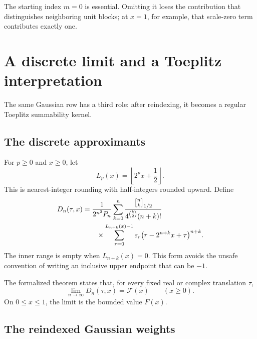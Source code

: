 \documentclass[11pt]{article}
\theoremstyle{definition}
\newcommand{\Fabius}{F}
\newcommand{\eps}{\varepsilon}
\newcommand{\Qbin}[3]{\genfrac{[}{]}{0pt}{}{#1}{#2}_{#3}}
\newcommand{\floor}[1]{\left\lfloor #1\right\rfloor}
\begin{document}
The starting index $m=0$ is essential.  Omitting it loses the contribution that distinguishes neighboring unit blocks; at $x=1$, for example, that scale-zero term contributes exactly one.

\section{A discrete limit and a Toeplitz interpretation}
\label{sec:discrete-limit}

The same Gaussian row has a third role: after reindexing, it becomes a regular Toeplitz summability kernel.

\subsection{The discrete approximants}

For $p\ge0$ and $x\ge0$, let
\begin{equation}
  L_p(x)=\floor{2^px+\frac12}.
  \label{eq:nearest-range}
\end{equation}
This is nearest-integer rounding with half-integers rounded upward.  Define
\begin{align}
  D_n(\tau,x)
  &=\frac{1}{2^{n^2}P_n}
    \sum_{k=0}^{n}
    \frac{\Qbin{n}{k}{1/2}}
         {4^{\binom{k}{2}}(n+k)!}\notag\\
  &\qquad\times
    \sum_{r=0}^{L_{n+k}(x)-1}
      \eps_r\bigl(r-2^{n+k}x+\tau\bigr)^{n+k}.
  \label{eq:Dn-definition}
\end{align}
The inner range is empty when $L_{n+k}(x)=0$.  This form avoids the unsafe convention of writing an inclusive upper endpoint that can be $-1$.

The formalized theorem states that, for every fixed real or complex translation $\tau$,
\begin{equation}
  \lim_{n\to\infty}D_n(\tau,x)=\mathcal F(x)
  \qquad(x\ge0).
  \label{eq:discrete-limit-result}
\end{equation}
On $0\le x\le1$, the limit is the bounded value $\Fabius(x)$.

\subsection{The reindexed Gaussian weights}
\end{document}
